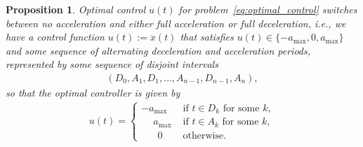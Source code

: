 \documentclass[a4paper]{article}
\theoremstyle{definition}
\theoremstyle{plain}
\newtheorem{proposition}{Proposition}
\begin{document}
\begin{proposition}
  \label{prop:optimal_control}
  Optimal control $u(t)$ for problem~\eqref{eq:optimal_control} switches between
  no acceleration and either full acceleration or full deceleration, i.e., we
  have a control function $u(t) := \ddot{x}(t)$ that satisfies
  $u(t) \in \{-a_{\max}, 0, a_{\max}\}$ and some sequence of alternating
  deceleration and acceleration periods, represented by some sequence of
  disjoint intervals
\begin{align*}
  (D_{0}, A_{1}, D_{1}, \dots, A_{n-1}, D_{n-1}, A_{n}) ,
\end{align*}
so that the optimal controller is given by
\begin{align}
  u(t) = \begin{cases}
           {-a_{\max}} &\text{ if } t \in D_{k} \text{ for some } k , \\
           \phantom{-} a_{\max}   &\text{ if } t \in A_{k} \text{ for some } k , \\
           \phantom{-} \;\, 0 &\text{ otherwise. }
         \end{cases}
\end{align}
\end{proposition}
\end{document}
